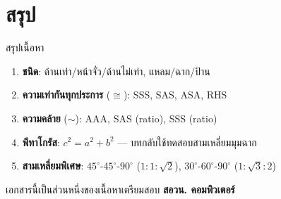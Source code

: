 \documentclass[11pt, aspectratio=169]{beamer}
\begin{document}
\section{สรุป}

\begin{frame}{สรุปเนื้อหา}
  \begin{explanation}[สิ่งที่ได้เรียนรู้]
    \begin{enumerate}
      \item \textbf{ชนิด}: ด้านเท่า/หน้าจั่ว/ด้านไม่เท่า, แหลม/ฉาก/ป้าน
      \item \textbf{ความเท่ากันทุกประการ} ($\cong$): SSS, SAS, ASA, RHS
      \item \textbf{ความคล้าย} ($\sim$): AAA, SAS (ratio), SSS (ratio)
      \item \textbf{พีทาโกรัส}: $c^2 = a^2 + b^2$ — บทกลับใช้ทดสอบสามเหลี่ยมมุมฉาก
      \item \textbf{สามเหลี่ยมพิเศษ}: $45^\circ$-$45^\circ$-$90^\circ$ ($1:1:\sqrt{2}$), $30^\circ$-$60^\circ$-$90^\circ$ ($1:\sqrt{3}:2$)
    \end{enumerate}
  \end{explanation}
  \begin{center}
    \large เอกสารนี้เป็นส่วนหนึ่งของเนื้อหาเตรียมสอบ \textbf{สอวน. คอมพิวเตอร์}
  \end{center}
\end{frame}
\end{document}
